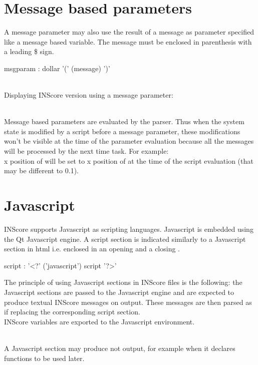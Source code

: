 \documentclass[a4paper,twoside]{report}
\newcommand{\sublevel}[1]	{\section{#1}}
\begin{document}
\sublevel{Message based parameters}
\label{scriptmsgparam}

A message parameter may also use the result of a  message as parameter specified like a message based variable.
The message must be enclosed in parenthesis with a leading \$ sign.

\begin{rail} 
msgparam : dollar '(' (message) ')'
\end{rail}

\example \\
Displaying INScore version using a message parameter:

\note{}\\
Message based parameters are evaluated by the parser. Thus when the system state is modified by a script before a message parameter, these modifications won't be visible at the time of the parameter evaluation because all the messages will be processed by the next time task. For example:\\
x position of  will be set to x position of  at the time of the script evaluation (that may be different to 0.1).


\sublevel{Javascript}
\label{javascript}

INScore supports Javascript as scripting languages. Javascript is embedded using the Qt Javascript engine. A script section is indicated similarly to a Javascript section in html i.e. enclosed in an opening  and a closing .

\begin{rail} 
script : '<?' ('javascript') script '?>'
\end{rail}

The principle of using Javascript sections in INScore files is the following: the Javascript sections are passed to the Javascript engine and are expected to produce textual INScore messages on output. These messages are then parsed as if replacing the corresponding script section.\\
INScore variables are exported to the Javascript environment.

\note{}\\
A Javascript section may produce not output, for example when it declares functions to be used later.
\end{document}
